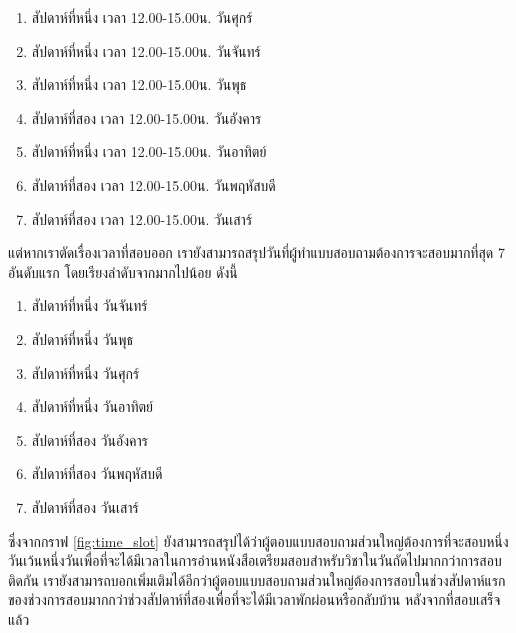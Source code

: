 \begin{enumerate}
  \item สัปดาห์ที่หนึ่ง เวลา 12.00-15.00น. วันศุกร์ 
  \item สัปดาห์ที่หนึ่ง เวลา 12.00-15.00น. วันจันทร์
  \item สัปดาห์ที่หนึ่ง เวลา 12.00-15.00น. วันพุธ
  \item สัปดาห์ที่สอง เวลา 12.00-15.00น. วันอังคาร
  \item สัปดาห์ที่หนึ่ง เวลา 12.00-15.00น. วันอาทิตย์
  \item สัปดาห์ที่สอง เวลา 12.00-15.00น. วันพฤหัสบดี
  \item สัปดาห์ที่สอง เวลา 12.00-15.00น. วันเสาร์
\end{enumerate}

แต่หากเราตัดเรื่องเวลาที่สอบออก เรายังสามารถสรุปวันที่ผู้ทำแบบสอบถามต้องการจะสอบมากที่สุด 7 อันดับแรก โดยเรียงลำดับจากมากไปน้อย ดังนี้
\begin{enumerate}
  \item สัปดาห์ที่หนึ่ง วันจันทร์
  \item สัปดาห์ที่หนึ่ง วันพุธ
  \item สัปดาห์ที่หนึ่ง วันศุกร์ 
  \item สัปดาห์ที่หนึ่ง วันอาทิตย์
  \item สัปดาห์ที่สอง วันอังคาร
  \item สัปดาห์ที่สอง วันพฤหัสบดี
  \item สัปดาห์ที่สอง วันเสาร์
\end{enumerate}
ซึ่งจากกราฟ \ref{fig:time_slot} ยังสามารถสรุปได้ว่าผู้ตอบแบบสอบถามส่วนใหญ่ต้องการที่จะสอบหนึ่งวันเว้นหนึ่งวันเพื่อที่จะได้มีเวลาในการอ่านหนังสือเตรียมสอบสำหรับวิชาในวันถัดไปมากกว่าการสอบติดกัน 
เรายังสามารถบอกเพิ่มเติมได้อีกว่าผู้ตอบแบบสอบถามส่วนใหญ่ต้องการสอบในช่วงสัปดาห์แรกของช่วงการสอบมากกว่าช่วงสัปดาห์ที่สองเพื่อที่จะได้มีเวลาพักผ่อนหรือกลับบ้าน หลังจากที่สอบเสร็จแล้ว

